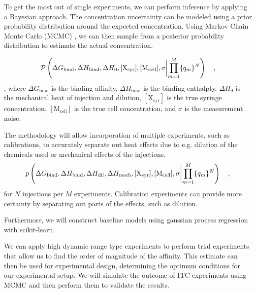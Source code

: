 \documentclass[10pt,final]{article}
\begin{document}
To get the most out of single experiments, we can perform inference by applying a Bayesian approach. The concentration uncertainty can be modeled using a prior probability distribution around the expected concentration. Using Markov Chain Monte Carlo (MCMC) \cite{Metropolis1953a,Hastings1970a}, we can then sample from a posterior probability distribution to estimate the actual concentration,

\[
\mathcal{P} \left(\Delta G_\mathrm{bind}, \Delta H_\mathrm{bind}, \Delta H_0, [\mathrm{X_{syr}}], [\mathrm{M_{cell}}], \sigma \biggl{|} \prod\limits_{m=1}^{M}\{q_m\}^{N}\right) \quad,
\]
, where $\Delta G_\mathrm{bind}$ is the binding affinity, $\Delta H_\mathrm{bind}$ is the binding enthalpty, $\Delta H_0$ is the mechanical heat of injection and dilution, $[\mathrm{X_{syr}}]$ is the true syringe concentration, $[\mathrm{M_{cell}}]$ is the true cell concentration, and $\sigma$ is the measurement noise.


The methodology will allow incorporation of multiple experiments, such as calibrations, to accurately separate out heat effects due to e.g. dilution of the chemicals used or mechanical effects of the injections.
\begin{align}
	p\left(\Delta G_\mathrm{bind}, \Delta H_\mathrm{bind}, \Delta H_\mathrm{dil},\Delta H_\mathrm{mech}, [\mathrm{X_{syr}}], [\mathrm{M_{cell}}], \sigma \biggl{|} \prod\limits_{m=1}^{M}\{q_m\}^{N}\right) \quad,
\end{align}
for $N$ injections per $M$ experiments. Calibration experiments can provide more certainty by separating out parts of the effects, such as dilution.

Furthermore, we will construct baseline models using gaussian process regression with scikit-learn\cite{Pedregosa2011a}.

We can apply high dynamic range type experiments to perform trial experiments that allow us to find the order of magnitude of the affinity.
This estimate can then be used for experimental design, determining the optimum conditions for our experimental setup.
We will simulate the outcome of ITC experiments using MCMC and then perform them to validate the results.
\end{document}
